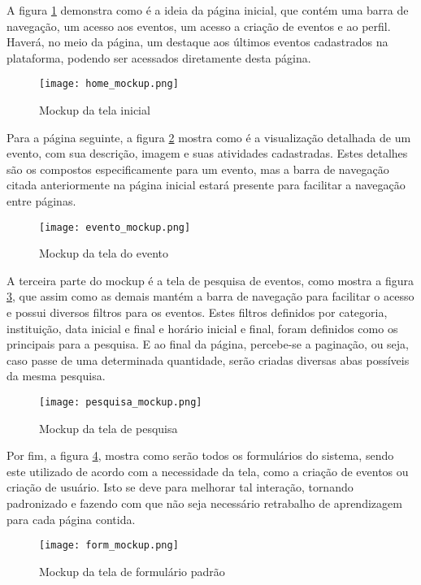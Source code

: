 A figura \ref{home_mockup} demonstra como é a ideia da página inicial, que contém uma barra de navegação, um acesso aos eventos, um acesso a criação de eventos e ao perfil. Haverá, no meio da página, um destaque aos últimos eventos cadastrados na plataforma, podendo ser acessados diretamente desta página.
\begin{figure}[h]
    \caption{\label{home_mockup}Mockup da tela inicial}
    \vspace{5pt}
    \centering
    \texttt{[image: home\_mockup.png]}
    \vspace{5pt}
\end{figure}

Para a página seguinte, a figura \ref{evento_mockup} mostra como é a visualização detalhada de um evento, com sua descrição, imagem e suas atividades cadastradas. Estes detalhes são os compostos especificamente para um evento, mas a barra de navegação citada anteriormente na página inicial estará presente para facilitar a navegação entre páginas.
\begin{figure}[h]
    \caption{\label{evento_mockup}Mockup da tela do evento}
    \vspace{5pt}
    \centering
    \texttt{[image: evento\_mockup.png]}
    \vspace{5pt}
\end{figure}

A terceira parte do mockup é a tela de pesquisa de eventos, como mostra a figura \ref{pesquisa_mockup}, que assim como as demais mantém a barra de navegação para facilitar o acesso e possui diversos filtros para os eventos. Estes filtros definidos por categoria, instituição, data inicial e final e horário inicial e final, foram definidos como os principais para a pesquisa. E ao final da página, percebe-se a paginação, ou seja, caso passe de uma determinada quantidade, serão criadas diversas abas possíveis da mesma pesquisa.
\begin{figure}[h]
    \caption{\label{pesquisa_mockup}Mockup da tela de pesquisa}
    \vspace{5pt}
    \centering
    \texttt{[image: pesquisa\_mockup.png]}
    \vspace{5pt}
\end{figure}

Por fim, a figura \ref{form_mockup}, mostra como serão todos os formulários do sistema, sendo este utilizado de acordo com a necessidade da tela, como a criação de eventos ou criação de usuário. Isto se deve para melhorar tal interação, tornando padronizado e fazendo com que não seja necessário retrabalho de aprendizagem para cada página contida.
\begin{figure}[h]
    \caption{\label{form_mockup}Mockup da tela de formulário padrão}
    \vspace{5pt}
    \centering
    \texttt{[image: form\_mockup.png]}
    \vspace{5pt}
\end{figure}

